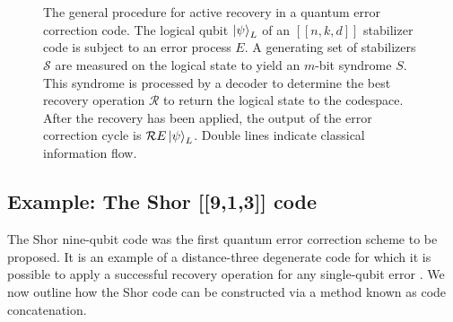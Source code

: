 \documentclass[]{arxiv}
\theoremstyle{plain}%
\theoremstyle{definition}
\theoremstyle{remark}
\begin{document}
      



\begin{figure}
\centering

\caption{The general procedure for active recovery in a quantum error correction code. The logical qubit $\ket{\psi}_L$ of an $[[n,k,d]]$ stabilizer code is subject to an error process $E$. A generating set of stabilizers $\mathcal{S}$ are measured on the logical state to yield an $m$-bit syndrome $S$. This syndrome is processed by a decoder to determine the best recovery operation $\mathcal{R}$ to return the logical state to the codespace. After the recovery has been applied, the output of the error correction cycle is $\mathcal{R}E\ket{\psi}_L$. Double lines indicate classical information flow.}
\label{fig:qec_proc}
\end{figure}





\subsection{Example: The Shor [[9,1,3]] code}\label{sec:shor9}

The Shor nine-qubit code was the first quantum error correction scheme to be proposed. It is an example of a distance-three degenerate code for which it is possible to apply a successful recovery operation for any single-qubit error \cite{Shor95}. We now outline how the Shor code can be constructed via a method known as code concatenation.
\end{document}
